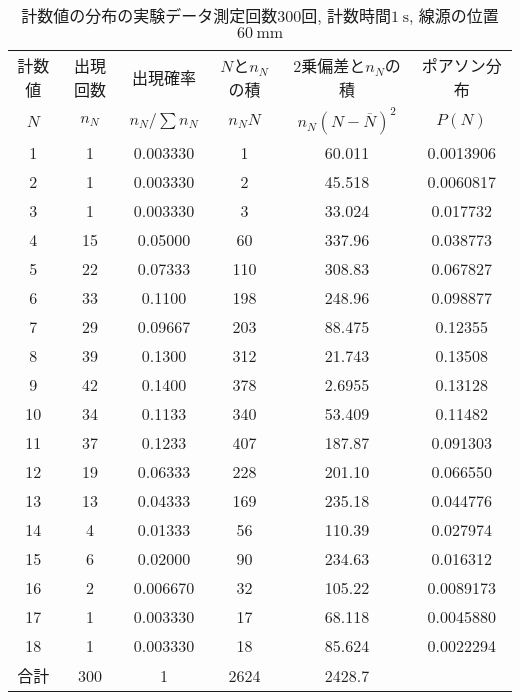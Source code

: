 \documentclass{jarticle}
\begin{document}
\begin{table}[H]
  \caption{計数値の分布の実験データ\protect\linebreak 測定回数$300$回, 計数時間$1\ \mathrm{s}$, 線源の位置$60\ \mathrm{mm}$}
  \label{tb:count-distribution-60mm-300times}
  \hspace{-1cm}
  \begin{tabular}{cccccc}
    \hline
    計数値 & 出現回数 & 出現確率 & $N$と$n_N$の積 & 2乗偏差と$n_N$の積 & ポアソン分布 \\
    $N$ & $n_N$ & $n_N/\sum n_N$ & $n_N N$ & $n_N(N-\overline{N})^2$ & $P(N)$ \\
    \hline
    1 & 1 & 0.003330 & 1 & 60.011 & 0.0013906 \\
    2 & 1 & 0.003330 & 2 & 45.518 & 0.0060817 \\
    3 & 1 & 0.003330 & 3 & 33.024 & 0.017732 \\
    4 & 15 & 0.05000 & 60 & 337.96 & 0.038773 \\
    5 & 22 & 0.07333 & 110 & 308.83 & 0.067827 \\
    6 & 33 & 0.1100 & 198 & 248.96 & 0.098877 \\
    7 & 29 & 0.09667 & 203 & 88.475 & 0.12355 \\
    8 & 39 & 0.1300 & 312 & 21.743 & 0.13508 \\
    9 & 42 & 0.1400 & 378 & 2.6955 & 0.13128 \\
    10 & 34 & 0.1133 & 340 & 53.409 & 0.11482 \\
    11 & 37 & 0.1233 & 407 & 187.87 & 0.091303 \\
    12 & 19 & 0.06333 & 228 & 201.10 & 0.066550 \\
    13 & 13 & 0.04333 & 169 & 235.18 & 0.044776 \\
    14 & 4 & 0.01333 & 56 & 110.39 & 0.027974 \\
    15 & 6 & 0.02000 & 90 & 234.63 & 0.016312 \\
    16 & 2 & 0.006670 & 32 & 105.22 & 0.0089173 \\
    17 & 1 & 0.003330 & 17 & 68.118 & 0.0045880 \\
    18 & 1 & 0.003330 & 18 & 85.624 & 0.0022294 \\
    \hline
    合計 & 300 & 1 & 2624 & 2428.7 & \\
    \hline
  \end{tabular}
\end{table}

\end{document}
